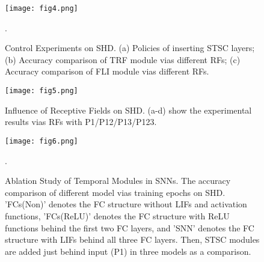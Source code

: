 \documentclass[letterpaper]{article} \usepackage[submission]{aaai23}  \usepackage{times}  \usepackage{helvet}  \usepackage{courier}  \usepackage[hyphens]{url}  \usepackage{graphicx} \urlstyle{rm} \def\UrlFont{\rm}  \usepackage{natbib}  \usepackage{caption} \frenchspacing  \setlength{\pdfpagewidth}{8.5in} \setlength{\pdfpageheight}{11in} \usepackage{algorithm}
\begin{document}
\begin{figure}[t]
\centering
\texttt{[image: fig4.png]} 
\caption{Control Experiments on SHD. (a) Policies of inserting STSC layers; (b) Accuracy comparison of TRF module vias different RFs; (c) Accuracy comparison of FLI module vias different RFs.
}.
\label{fig4}
\end{figure}

\begin{figure}[t]
\centering
\texttt{[image: fig5.png]} 
\caption{Influence of Receptive Fields on SHD. (a-d) show the experimental results vias RFs with P1/P12/P13/P123.
}
\label{fig5}
\end{figure}

\begin{figure}[t]
\centering
\texttt{[image: fig6.png]} 
\caption{Ablation Study of Temporal Modules in SNNs. The accuracy comparison of different model vias training epochs on SHD.
'FCs(Non)' denotes the FC structure without LIFs and activation functions, 'FCs(ReLU)' denotes the FC structure with ReLU functions behind the first two FC layers, and 'SNN' denotes the FC structure with LIFs behind all three FC layers. Then, STSC modules are added just behind input (P1) in three models as a comparison.
}.
\label{fig6}
\end{figure}
\end{document}
